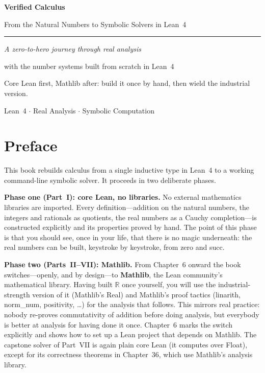 \documentclass[12pt, openany]{book}
\theoremstyle{plain}
\theoremstyle{definition}
\theoremstyle{remark}
\newcommand{\R}{\mathbb{R}}
\newcommand{\li}[1]{{\ttfamily\small\color{tealaccent}#1}}
\begin{document}
\color{black}

\begin{titlepage}
\pagecolor{navyblue}\color{white}\centering\vspace*{3.5cm}
{\fontsize{38}{48}\selectfont\bfseries Verified Calculus\par}\vspace{0.7cm}
{\fontsize{17}{24}\selectfont\color{tealaccent!80!white}
From the Natural Numbers to Symbolic Solvers in Lean~4\par}\vspace{1.8cm}
{\color{white!50!navyblue}\rule{0.55\textwidth}{0.5pt}}\vspace{1.8cm}
{\large\itshape A zero-to-hero journey through real analysis\par
with the number systems built from scratch in Lean~4\par}
\vfill
{\small\color{white!60!navyblue}Core Lean first, Mathlib after: build it once by hand, then wield the industrial version.\par}
\vspace{0.5cm}
{\small\color{white!50!navyblue}Lean~4 $\cdot$ Real Analysis $\cdot$ Symbolic Computation}
\end{titlepage}
\nopagecolor\color{black}

\frontmatter

\chapter*{Preface}
\color{black}

This book rebuilds calculus from a single inductive type in Lean~4 to a working command-line symbolic solver. It proceeds in two deliberate phases.

\medskip\noindent\textbf{Phase one (Part~I): core Lean, no libraries.} No external mathematics libraries are imported. Every definition---addition on the natural numbers, the integers and rationals as quotients, the real numbers as a Cauchy completion---is constructed explicitly and its properties proved by hand. The point of this phase is that you should see, once in your life, that there is no magic underneath: the real numbers can be built, keystroke by keystroke, from \li{zero} and \li{succ}.

\medskip\noindent\textbf{Phase two (Parts~II--VII): Mathlib.} From Chapter~6 onward the book switches---openly, and by design---to \textbf{Mathlib}, the Lean community's mathematical library. Having built $\R$ once yourself, you will use the industrial-strength version of it (Mathlib's \li{Real}) and Mathlib's proof tactics (\li{linarith}, \li{norm\_num}, \li{positivity}, \ldots) for the analysis that follows. This mirrors real practice: nobody re-proves commutativity of addition before doing analysis, but everybody is better at analysis for having done it once. Chapter~6 marks the switch explicitly and shows how to set up a Lean project that depends on Mathlib. The capstone solver of Part~VII is again plain core Lean (it computes over \li{Float}), except for its correctness theorems in Chapter~36, which use Mathlib's analysis library.
\end{document}
